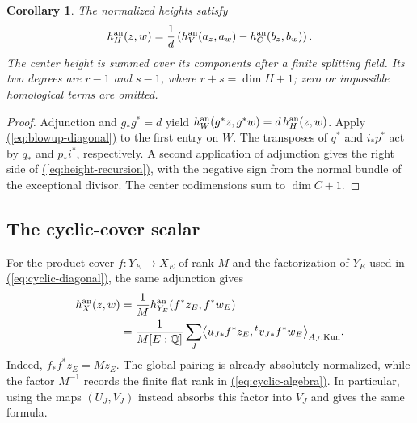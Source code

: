 \documentclass[11pt,a4paper]{article}
\newtheorem{corollary}[theorem]{Corollary}
\theoremstyle{definition}
\theoremstyle{remark}\newtheorem{remark}[theorem]{Remark}
\numberwithin{equation}{section}
\newcommand{\Q}{\mathbb Q}\newcommand{\R}{\mathbb R}\newcommand{\C}{\mathbb C}
\renewcommand{\eqref}[1]{\hyperref[#1]{\textcolor{equationlink}{(\ref*{#1})}}}
\begin{document}
\begin{corollary}\label{cor:height-recursion}
The normalized heights satisfy
\begin{equation}\label{eq:height-recursion}
 h_H^{\mathrm{an}}(z,w)=\frac1d
          \left(h_V^{\mathrm{an}}(a_z,a_w)-h_C^{\mathrm{an}}(b_z,b_w)\right).
\end{equation}
The center height is summed over its components after a finite
splitting field. Its two degrees are $r-1$ and $s-1$, where
$r+s=\dim H+1$; zero or impossible homological terms are omitted.
\end{corollary}

\begin{proof}
Adjunction and $g_*g^*=d$ yield
$h_W^{\mathrm{an}}(g^*z,g^*w)=d\,h_H^{\mathrm{an}}(z,w)$. Apply
\eqref{eq:blowup-diagonal} to the first entry on $W$.
The transposes of $q^*$ and $i_*p^*$ act by $q_*$ and
$p_*i^*$, respectively. A second application of adjunction
gives the right side of \eqref{eq:height-recursion}, with
the negative sign from the normal bundle of the exceptional
divisor. The center codimensions sum to $\dim C+1$.
\end{proof}

\subsection{The cyclic-cover scalar}

For the product cover $f:Y_E\to X_E$ of rank $M$ and the
factorization of $Y_E$ used in \eqref{eq:cyclic-diagonal},
the same adjunction gives
\begin{align}
 h_X^{\an}(z,w)
 &=\frac1M h_{Y_E}^{\an}(f^*z_E,f^*w_E)\notag\\
 &=\frac1{M[E:\Q]}\sum_J
   \bigl\langle u_{J*}f^*z_E,{}^tv_{J*}f^*w_E
              \bigr\rangle_{A_J,\mathrm{Kun}}.\label{eq:cyclic-height}
\end{align}
Indeed, $f_*f^*z_E=M z_E$. The global pairing is already
absolutely normalized, while the factor $M^{-1}$ records the
finite flat rank in \eqref{eq:cyclic-algebra}. In particular,
using the maps $(U_J,V_J)$ instead absorbs this factor into
$V_J$ and gives the same formula.
\end{document}

